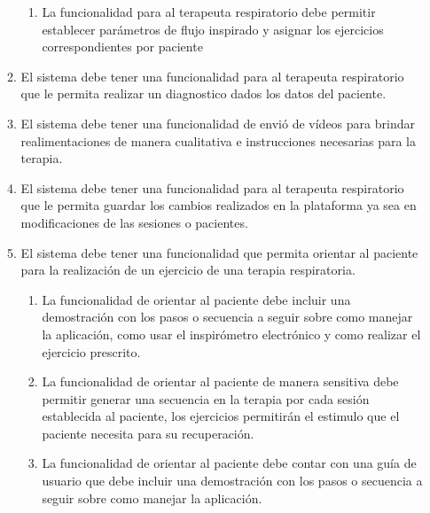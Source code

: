 \documentclass[12pt]{article}
\begin{document}
\begin{enumerate}[start=1,label={\bfseries RF0\arabic*.}]
\begin{enumerate}[label*=\arabic*.]
\begin{enumerate}[label*=\arabic*.]
                \item La funcionalidad para al terapeuta respiratorio debe permitir establecer parámetros de flujo inspirado y asignar los ejercicios correspondientes por paciente
                
                
            \end{enumerate}
            
    \item El sistema debe tener una funcionalidad para al terapeuta respiratorio que le permita realizar un diagnostico dados los datos del paciente.%
    
    \item  El sistema debe tener una funcionalidad de envió de vídeos para brindar realimentaciones de manera cualitativa e instrucciones necesarias para la terapia.
    
    
    \item El sistema debe tener una funcionalidad para al terapeuta respiratorio que le permita guardar los cambios realizados en la plataforma ya sea en modificaciones de las sesiones o pacientes.
    
    
    
            

    \item El sistema debe tener una funcionalidad que permita orientar al paciente  para la realización de un ejercicio de una terapia respiratoria. 
    \label{RF01}
            \begin{enumerate}[label*=\arabic*.]
            
                \item La funcionalidad de orientar al paciente debe incluir una demostración con los pasos o secuencia a seguir sobre como manejar la aplicación, como usar el inspirómetro electrónico y como realizar el ejercicio prescrito.
                
                \item La funcionalidad de orientar al paciente de manera sensitiva debe permitir generar una secuencia en la terapia por cada sesión establecida al paciente, los ejercicios permitirán el estimulo que el paciente  necesita para su recuperación. %
                
                \item La funcionalidad de orientar al paciente debe contar con una guía de usuario que debe incluir una demostración con los pasos o secuencia a seguir sobre como manejar la aplicación.
                

\end{enumerate}
\end{enumerate}
\end{enumerate}
\end{document}
